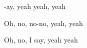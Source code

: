 \begin{song}
\bigskip

-ay, yeah  yeah, yeah \par
{}Oh, no, no-no, yeah, yeah \par
{}Oh, no, I say, yeah yeah \par
{}     \par
{} \par

\end{song}
